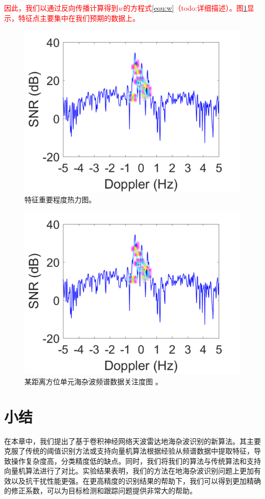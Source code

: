 \textcolor{red}{因此，我们以通过反向传播计算得到$ w $的方程式\ref{equ:w}（todo:详细描述）。图\ref{fig:vis}显示，特征点主要集中在我们预期的数据上。}
\begin{figure}[!t]
	\centering
	\includegraphics[width=\textwidth]{figures/heatmap.pdf}
	\caption{特征重要程度热力图。}
	\label{fig:vis}
\end{figure}
\begin{figure}[!t]
	\centering
	\includegraphics[width=\textwidth]{figures/heatmap.pdf}
	\caption{某距离方位单元海杂波频谱数据关注度图
	。}
	\label{fig:visfeature}
\end{figure}
\section{小结}
在本章中，我们提出了基于卷积神经网络天波雷达地海杂波识别的新算法。其主要克服了传统的阈值识别方法或支持向量机算法根据经验从频谱数据中提取特征，导致操作复杂度高，分类精度低的缺点。同时，我们将我们的算法与传统算法和支持向量机算法进行了对比。实验结果表明，我们的方法在地海杂波识别问题上更加有效以及抗干扰性能更强。在更高精度的识别结果的帮助下，我们可以得到更加精确的修正系数，可以为目标检测和跟踪问题提供非常大的帮助。